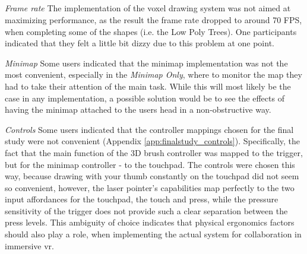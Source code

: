 
\subparagraph[Future work]{}

\textit{Frame rate} The implementation of the voxel drawing system was not aimed at maximizing performance, as the result the frame rate dropped to around 70 FPS, when completing some of the shapes (i.e. the Low Poly Trees). One participants indicated that they felt a little bit dizzy due to this problem at one point.

\textit{Minimap} Some users indicated that the minimap implementation was not the most convenient, especially in the \textit{Minimap Only}, where to monitor the map they had to take their attention of the main task. While this will most likely be the case in any implementation, a possible solution would be to see the effects of having the minimap attached to the users head in a non-obstructive way.

\textit{Controls} Some users indicated that the controller mappings chosen for the final study were not convenient (Appendix \ref{app:finalstudy_controls}). Specifically, the fact that the main function of the 3D brush controller was mapped to the trigger, but for the minimap controller - to the touchpad. The controls were chosen this way, because drawing with your thumb constantly on the touchpad did not seem so convenient, however, the laser pointer's capabilities map perfectly to the two input affordances for the touchpad, the touch and press, while the pressure sensitivity of the trigger does not provide such a clear separation between the press levels. This ambiguity of choice indicates that physical ergonomics factors should also play a role, when implementing the actual system for collaboration in immersive \gls{vr}.

